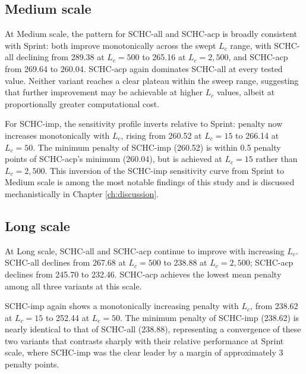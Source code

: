 \documentclass[12pt, a4paper, oneside]{report}
\begin{document}
\subsection{Medium scale}
\label{sec:Medium_sensitivity}

At Medium scale, the pattern for SCHC-all and SCHC-acp is broadly
consistent with Sprint: both improve monotonically across the swept
$L_c$ range, with SCHC-all declining from 289.38 at $L_c = 500$ to
265.16 at $L_c = 2{,}500$, and SCHC-acp from 269.64 to 260.04.
SCHC-acp again dominates SCHC-all at every tested value. Neither
variant reaches a clear plateau within the sweep range, suggesting
that further improvement may be achievable at higher $L_c$ values,
albeit at proportionally greater computational cost.

For SCHC-imp, the sensitivity profile inverts relative to Sprint:
penalty now increases monotonically with $L_c$, rising from 260.52
at $L_c = 15$ to 266.14 at $L_c = 50$. The minimum penalty of
SCHC-imp (260.52) is within 0.5 penalty points of SCHC-acp's minimum
(260.04), but is achieved at $L_c = 15$ rather than $L_c = 2{,}500$.
This inversion of the SCHC-imp sensitivity curve from Sprint to
Medium scale is among the most notable findings of this study and is
discussed mechanistically in Chapter \ref{ch:discussion}.

\newpage
\subsection{Long scale}
\label{sec:Long_sensitivity}

At Long scale, SCHC-all and SCHC-acp continue to improve with
increasing $L_c$. SCHC-all declines from 267.68 at $L_c = 500$ to
238.88 at $L_c = 2{,}500$; SCHC-acp declines from 245.70 to 232.46.
SCHC-acp achieves the lowest mean penalty among all three variants
at this scale.

SCHC-imp again shows a monotonically increasing penalty with $L_c$,
from 238.62 at $L_c = 15$ to 252.44 at $L_c = 50$. The minimum
penalty of SCHC-imp (238.62) is nearly identical to that of SCHC-all
(238.88), representing a convergence of these two variants that
contrasts sharply with their relative performance at Sprint scale,
where SCHC-imp was the clear leader by a margin of approximately 3
penalty points.
\end{document}
